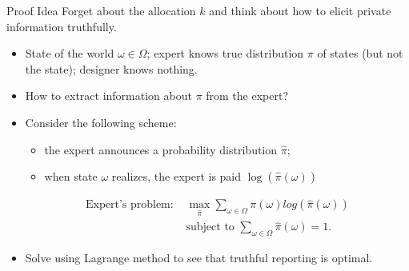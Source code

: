 \documentclass[english,10pt
,aspectratio=169
]{beamer}
\begin{document}
\begin{frame}{Proof Idea}
Forget about the allocation \(k\) and think about how to elicit private information truthfully.
\begin{example}
	\begin{itemize}
		\item State of the world $\omega \in \Omega$; expert knows true distribution $\pi$ of states (but not the state); designer knows nothing.
		\item How to extract information about $\pi$ from the expert?
		\item Consider the following scheme:
		\begin{itemize}
			\item the expert announces a probability distribution $\hat{\pi}$;
			\item when state $\omega$ realizes, the expert is paid $\log(\hat{\pi}(\omega))$
		\end{itemize}
		{\footnotesize
			\begin{align*}
				\text{Expert's problem: } & \max_{\hat{\pi}}\sum_{\omega\in\Omega} \pi(\omega) log(\hat{\pi}(\omega))
				\\
				&\text{subject to } \sum_{\omega\in\Omega} \hat{\pi}(\omega)=1.
			\end{align*}
			\vspace{-1ex}
		}
		\item Solve using Lagrange method to see that truthful reporting is optimal.
	\end{itemize}
\end{example}
\end{frame}
\end{document}
